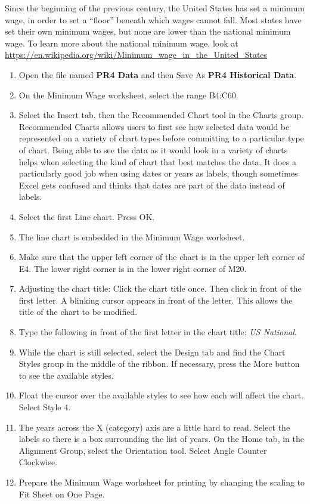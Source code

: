 Since the beginning of the previous century, the United States has set a minimum wage, in order to set a ``floor'' beneath which wages cannot fall. Most states have set their own minimum wages, but none are lower than the national minimum wage. To learn more about the national minimum wage, look at \url{https://en.wikipedia.org/wiki/Minimum_wage_in_the_United_States}

\begin{enumerate}
	\item Open the file named \textbf{PR4 Data} and then Save As \textbf{PR4 Historical Data}.
	\item On the Minimum Wage worksheet, select the range \textsf{B4:C60}.
	\item Select the Insert tab, then the Recommended Chart tool in the Charts group. Recommended Charts allows users to first see how selected data would be represented on a variety of chart types before committing to a particular type of chart. Being able to see the data as it would look in a variety of charts helps when selecting the kind of chart that best matches the data. It does a particularly good job when using dates or years as labels, though sometimes Excel gets confused and thinks that dates are part of the data instead of labels.
	\item Select the first Line chart. Press OK.
	\item The line chart is embedded in the Minimum Wage worksheet.
	\item Make sure that the upper left corner of the chart is in the upper left corner of \textsf{E4}. The lower right corner is in the lower right corner of \textsf{M20}.
	\item Adjusting the chart title: Click the chart title once. Then click in front of the first letter. A blinking cursor appears in front of the letter. This allows the title of the chart to be modified.
	\item Type the following in front of the first letter in the chart title: \textit{US National}.
	\item While the chart is still selected, select the Design tab and find the Chart Styles group in the middle of the ribbon. If necessary, press the More button to see the available styles.
	\item Float the cursor over the available styles to see how each will affect the chart. Select Style $ 4 $.
	\item The years across the X (category) axis are a little hard to read. Select the labels so there is a box surrounding the list of years. On the Home tab, in the Alignment Group, select the Orientation tool. Select Angle Counter Clockwise.
	\item Prepare the Minimum Wage worksheet for printing by changing the scaling to Fit Sheet on One Page.
\end{enumerate}

